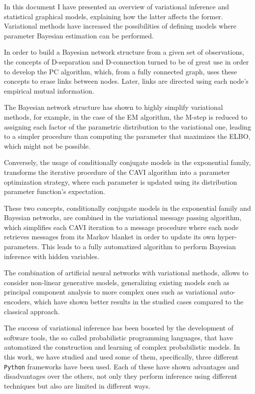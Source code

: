 

In this document I have presented an overview of variational inference and statistical graphical models, explaining how the latter affects the former. Variational methods have increased the possibilities of defining models where parameter Bayesian estimation can be performed.

In order to build a Bayesian network structure from a given set of observations, the concepts of D-separation and D-connection turned to be of great use in order to develop the PC algorithm, which, from a fully connected graph, uses these concepts to erase links between nodes. Later, links are directed using each node's empirical mutual information.

The Bayesian network structure has shown to highly simplify variational methods, for example, in the case of the EM algorithm, the M-step is reduced to assigning each factor of the parametric distribution to the variational one, leading to a simpler procedure than computing the parameter that maximizes the ELBO, which might not be possible.

Conversely, the usage of conditionally conjugate models in the exponential family, transforms the iterative procedure of the CAVI algorithm into a parameter optimization strategy, where each parameter is updated using its distribution parameter function's expectation.

These two concepts, conditionally conjugate models in the exponential family and Bayesian networks, are combined in the variational message passing algorithm, which simplifies each CAVI iteration to a message procedure where each node retrieves messages from its Markov blanket in order to update its own hyper-parameters. This leads to a fully automatized algorithm to perform Bayesian inference with hidden variables.

The combination of artificial neural networks with variational methods, allows to consider non-linear generative models, generalizing existing models such as principal component analysis to more complex ones such as variational auto-encoders, which have shown better results in the studied cases compared to the classical approach.

The success of variational inference has been boosted by the development of software tools, the so called probabilistic programming languages, that have automatized the construction and learning of complex probabilistic models. In this work, we have studied and used some of them, specifically, three different \texttt{Python} frameworks have been used. Each of these have shown advantages and disadvantages over the others, not only they perform inference using different techniques but also are limited in different ways.

